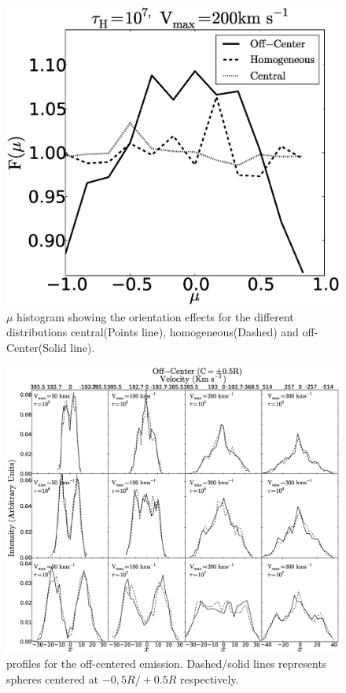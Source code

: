 \documentclass{emulateapj}
\newcommand{\ly}{{\ifmmode{{\rm Ly}\alpha~}\else{Ly$\alpha$~}\fi}}
\begin{document}
\begin{figure}
  \includegraphics[scale=0.35]{f9.eps}
  \caption{$\mu$ histogram showing the orientation effects for the different
  distributions central(Points line), homogeneous(Dashed) and off-Center(Solid line).  
    \label{fig:muhisto}} 
\end{figure}



\begin{figure}
\begin{center}
\includegraphics[scale=0.3]{f10.eps}
\end{center}
\caption{\ly profiles for the off-centered emission. Dashed/solid
  lines represents spheres centered at $-0,5R/+0.5R$ respectively.
   \label{fig:OC_profiles}} 
\end{figure}
\end{document}

